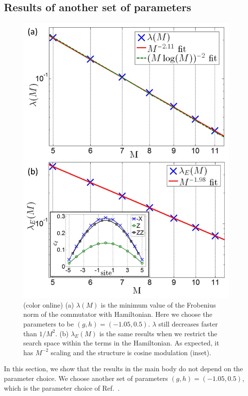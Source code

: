 \documentclass[twocolumn,superscriptaddress, prb]{revtex4-1}
\begin{document}
\subsection{Results of another set of parameters}
\begin{figure}
\includegraphics[width=1.0\linewidth]{fig_hamiltonian_other.pdf}
\centering
\caption{(color online) (a) $\lambda(M)$ is the minimum value of the Frobenius norm of the commutator with Hamiltonian.
Here we choose the parameters to be $(g,h) = (-1.05, 0.5)$. $\lambda$ still decreases faster than $1/M^2$.
(b) $\lambda_E(M)$ is the same results when we restrict the search space within the terms in the Hamiltonian.
As expected, it has $M^{-2}$ scaling and the structure is cosine modulation (inset).}
\label{fig:hamiltonian_other}
\end{figure}
In this section, we show that the results in the main body do not depend on the parameter choice.
We choose another set of parameters $(g,h) = (-1.05, 0.5)$, which is the parameter choice of Ref.~.
\end{document}
